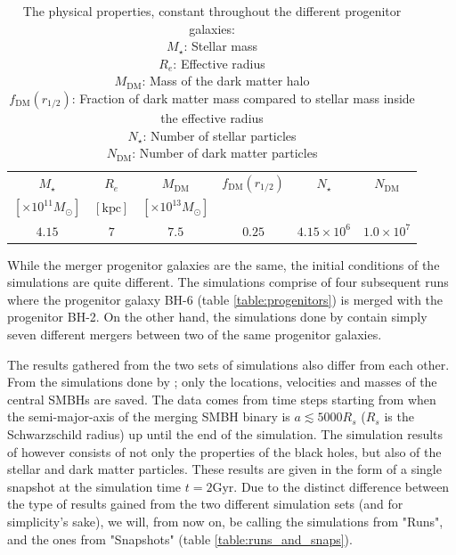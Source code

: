 \documentclass[english, oneside]{HYgradu}
\begin{document}
\begin{table}
	\begin{center}
		\begin{tabular}{c c c c c c}
		\hline
		\hline
		$M_\star$ & $R_e$ & $M_\mathrm{DM}$ & $f_\mathrm{DM}(r_{1/2})$ & $N_\star$ & $N_\mathrm{DM}$ \\
		$[\times 10^{11} M_\odot]$ & $[\mathrm{kpc}]$ & $[\times 10^{13} M_\odot]$ & & & \\
		\hline
		$4.15$ & $7$ & $7.5$ & $0.25$ & $4.15 \times 10^6$ & $1.0 \times 10^7$ \\
		\hline
		\end{tabular}
	\end{center}
	\caption{The physical properties, constant throughout the different progenitor galaxies: \\
	$M_\star$: Stellar mass \\
	$R_e$: Effective radius \\
	$M_\mathrm{DM}$: Mass of the dark matter halo \\
	$f_\mathrm{DM}(r_{1/2})$: Fraction of dark matter mass compared to stellar mass inside the effective radius \\
	$N_\star$: Number of stellar particles \\
	$N_\mathrm{DM}$: Number of dark matter particles}
	\label{table:properties}
\end{table}

While the merger progenitor galaxies are the same, the initial conditions of the simulations are quite different. The \cite{Mannerkoski2019} simulations comprise of four subsequent runs where the progenitor galaxy BH-6 (table \ref{table:progenitors}) is merged with the progenitor BH-2. On the other hand, the simulations done by \cite{Rantala2018} contain simply seven different mergers between two of the same progenitor galaxies.

The results gathered from the two sets of simulations also differ from each other. From the simulations done by \cite{Mannerkoski2019}; only the locations, velocities and masses of the central SMBHs are saved. The data comes from time steps starting from when the semi-major-axis of the merging SMBH binary is $a \lesssim 5000 R_s$ ($R_s$ is the Schwarzschild radius) up until the end of the simulation. The simulation results of \cite{Rantala2018} however consists of not only the properties of the black holes, but also of the stellar and dark matter particles. These results are given in the form of a single snapshot at the simulation time $t = 2 \mathrm{Gyr}$. Due to the distinct difference between the type of results gained from the two different simulation sets (and for simplicity's sake), we will, from now on, be calling the simulations from \cite{Mannerkoski2019} "Runs", and the ones from \cite{Rantala2018} "Snapshots" (table \ref{table:runs_and_snaps}).
\end{document}
